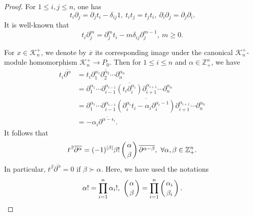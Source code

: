\documentclass[12pt, a4paper]{amsart}
\theoremstyle{Theorem}
\theoremstyle{Theorem}
\numberwithin{equation}{section}
\begin{document}
\begin{proof}
	\maketitle
	
	For $1\le i,j\le n$, one has
	\begin{equation*}
		t_i\partial_j=\partial_jt_i-\delta_{ij}1,~t_it_j=t_jt_i,~\partial_i\partial_j=\partial_j\partial_i.
	\end{equation*}
	It is well-known that
	\begin{equation*}
		t_i\partial_j^m=\partial_j^mt_i-m\delta_{ij}\partial_j^{m-1},~m\geq 0.
	\end{equation*}
	
For $x\in \mathcal{K}_n^+$, we denote by $\overline{x}$ its corresponding image under the canonical $\mathcal{K}_n^+$-module homomorphism
	$\mathcal{K}_n^+\rightarrow P_0$. Then for $1\leq i\leq n$ and $\alpha\in\mathbb{Z}_+^n$, we have
	\begin{align*}
		t_i\overline{\partial^\alpha}&=\overline{t_i\partial_1^{\alpha_1}\partial_2^{\alpha_2}\cdots\partial_n^{\alpha_n}}\\
		&=\overline{\partial_1^{\alpha_1}\cdots\partial_{i-1}^{\alpha_{i
					-1}}(t_i\partial_i^{\alpha_i})\partial_{i+1}^{\alpha_{i+1}}\cdots\partial_n^{\alpha_n}}\\
		&=\overline{\partial_1^{\alpha_1}\cdots\partial_{i-1}^{\alpha_{i-1}}(\partial_i^{\alpha_i}t_i-\alpha_i\partial_i
			^{\alpha_i-1})\partial_{i+1}^{\alpha_{i+1}}\cdots\partial_n^{\alpha_n}}\\
		&=-\alpha_i\overline{\partial^{\alpha-\epsilon_i}}.
	\end{align*}
	It follows that
	\begin{equation*}
		t^{\beta}\overline{\partial^{\alpha}}=(-1)^{|\beta|}\beta!
\left(\alpha\atop\beta\right)\overline{\partial^{\alpha-\beta}},~\forall \alpha,\beta\in\mathbb{Z}_+^n.
	\end{equation*}
	In particular,
	$t^{\beta}\overline{\partial^{\alpha}}=0$ if $\beta\succ\alpha$. 
	Here, we have used the notations
	\begin{equation*}
		\alpha!=\prod_{i=1}^n\alpha_i!,~\left(\alpha\atop\beta\right)=\prod_{i=1}^n\left(\alpha_i\atop\beta_i\right).
	\end{equation*}
	

\end{proof}
\end{document}
